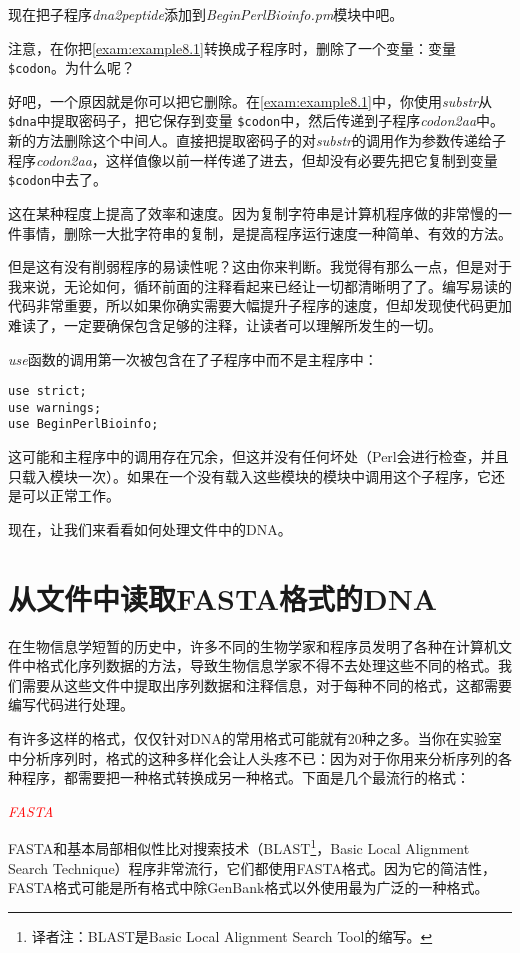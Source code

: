 现在把子程序\textit{dna2peptide}添加到\textit{BeginPerlBioinfo.pm}模块中吧。

注意，在你把\autoref{exam:example8.1}转换成子程序时，删除了一个变量：变量 \verb|$codon|。为什么呢？

好吧，一个原因就是你可以把它删除。在\autoref{exam:example8.1}中，你使用\textit{substr}从 \verb|$dna|中提取密码子，把它保存到变量 \verb|$codon|中，然后传递到子程序\textit{codon2aa}中。新的方法删除这个中间人。直接把提取密码子的对\textit{substr}的调用作为参数传递给子程序\textit{codon2aa}，这样值像以前一样传递了进去，但却没有必要先把它复制到变量 \verb|$codon|中去了。

这在某种程度上提高了效率和速度。因为复制字符串是计算机程序做的非常慢的一件事情，删除一大批字符串的复制，是提高程序运行速度一种简单、有效的方法。

但是这有没有削弱程序的易读性呢？这由你来判断。我觉得有那么一点，但是对于我来说，无论如何，循环前面的注释看起来已经让一切都清晰明了了。编写易读的代码非常重要，所以如果你确实需要大幅提升子程序的速度，但却发现使代码更加难读了，一定要确保包含足够的注释，让读者可以理解所发生的一切。

\textit{use}函数的调用第一次被包含在了子程序中而不是主程序中：

\begin{lstlisting}
use strict;
use warnings;
use BeginPerlBioinfo;
\end{lstlisting}

这可能和主程序中的调用存在冗余，但这并没有任何坏处（Perl会进行检查，并且只载入模块一次）。如果在一个没有载入这些模块的模块中调用这个子程序，它还是可以正常工作。

现在，让我们来看看如何处理文件中的DNA。

\section{从文件中读取FASTA格式的DNA}
在生物信息学短暂的历史中，许多不同的生物学家和程序员发明了各种在计算机文件中格式化序列数据的方法，导致生物信息学家不得不去处理这些不同的格式。我们需要从这些文件中提取出序列数据和注释信息，对于每种不同的格式，这都需要编写代码进行处理。

有许多这样的格式，仅仅针对DNA的常用格式可能就有20种之多。当你在实验室中分析序列时，格式的这种多样化会让人头疼不已：因为对于你用来分析序列的各种程序，都需要把一种格式转换成另一种格式。下面是几个最流行的格式：

\textcolor{red}{\textit{FASTA}}
\begin{adjustwidth}{4em}{}
FASTA和基本局部相似性比对搜索技术（BLAST\footnote{译者注：BLAST是Basic Local Alignment Search Tool的缩写。}，Basic Local Alignment Search Technique）程序非常流行，它们都使用FASTA格式。因为它的简洁性，FASTA格式可能是所有格式中除GenBank格式以外使用最为广泛的一种格式。
\end{adjustwidth}

